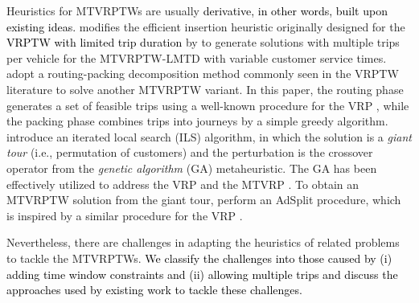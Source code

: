 \documentclass[11pt]{article}
\newcommand\add[1]{\textcolor{black}{#1}}
\newcommand\addb[1]{\textcolor{black}{#1}}
\begin{document}
Heuristics for MTVRPTWs are usually \addb{derivative, in other words, built upon existing ideas.}  \cite{karoonsoontawong2015efficient} modifies the efficient insertion heuristic originally designed for the \add{VRPTW with limited trip duration} by \cite{campbell2004efficient} to generate solutions with multiple trips per vehicle for the MTVRPTW-LMTD with variable customer service times.  \cite{battarra2009adaptive} adopt a routing-packing decomposition method commonly seen in the VRPTW literature \citep[e.g.,][]{fleischmann1990vehicle, taillard1996vehicle} to solve another MTVRPTW variant.  In this paper, the routing phase generates a set of feasible trips using a well-known procedure for the VRP \citep{christofides1976vehicle}, while the packing phase combines trips into journeys by a simple greedy algorithm.  \cite{cattaruzza2014iterated} introduce an iterated local search (ILS) algorithm, in which the solution is a \textit{giant tour} (i.e., permutation of customers) and the perturbation is the crossover operator from the \textit{genetic algorithm} (GA) metaheuristic.  The GA has been effectively utilized to address the VRP and the MTVRP \citep{prins2004simple, cattaruzza2014memetic}.  To obtain an MTVRPTW solution from the giant tour, \cite{cattaruzza2014iterated} perform an AdSplit procedure, which is inspired by a similar procedure for the VRP \citep{prins2004simple}.
\newline


Nevertheless, there are challenges in adapting the heuristics of related problems to tackle the MTVRPTWs.  \add{We classify the challenges into those caused by (i) adding time window constraints and (ii) allowing multiple trips and discuss the approaches used by existing work to tackle these challenges.}
\end{document}
